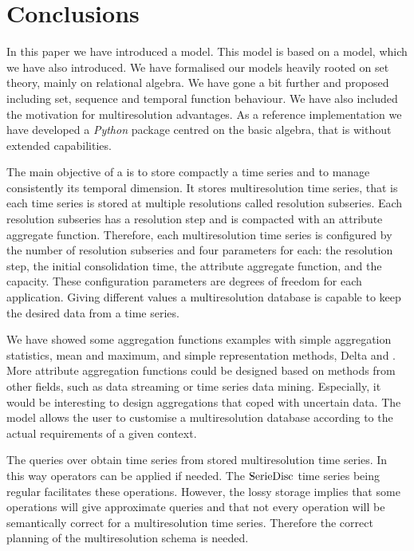 \section{Conclusions}
\label{sec:concl-future-work}

In this paper we have introduced a  model. This model is
based on a  model, which we have also introduced.  We have
formalised our models heavily rooted on set theory, mainly on
relational algebra. We have gone a bit further and proposed
 including set, sequence and temporal function
behaviour. We have also included the motivation for multiresolution
advantages.  As a reference implementation we have developed a
\emph{Python} package centred on the basic algebra, that is without
extended  capabilities.



The main objective of a  is to store compactly a time
series and to manage consistently its temporal dimension.  It stores
multiresolution time series, that is each time series is stored at
multiple resolutions called resolution subseries.  Each resolution
subseries has a resolution step and is compacted with an attribute
aggregate function. Therefore, each multiresolution time series is
configured by the number of resolution subseries and four parameters
for each: the resolution step, the initial consolidation time, the
attribute aggregate function, and the capacity.  These configuration
parameters are degrees of freedom for each application. Giving
different values a multiresolution database is capable to keep the
desired data from a time series. %

We have showed some aggregation functions examples with simple
aggregation statistics, mean and maximum, and simple representation
methods, Delta and \zohe{}. More attribute aggregation functions could
be designed based on methods from other fields, such as data streaming
or time series data mining. Especially, it would be interesting to
design aggregations that coped with uncertain data.  The model allows
the user to customise a multiresolution database according to the
actual requirements of a given context.

The queries over  obtain time series from stored
multiresolution time series. In this way  operators can be
applied if needed. The $\operatorname{SerieDisc}$ time series being regular
facilitates these operations. However, the lossy storage implies that
some operations will give approximate queries and that not every
 operation will be semantically correct for a
multiresolution time series. Therefore the correct planning of the
multiresolution schema is needed.

